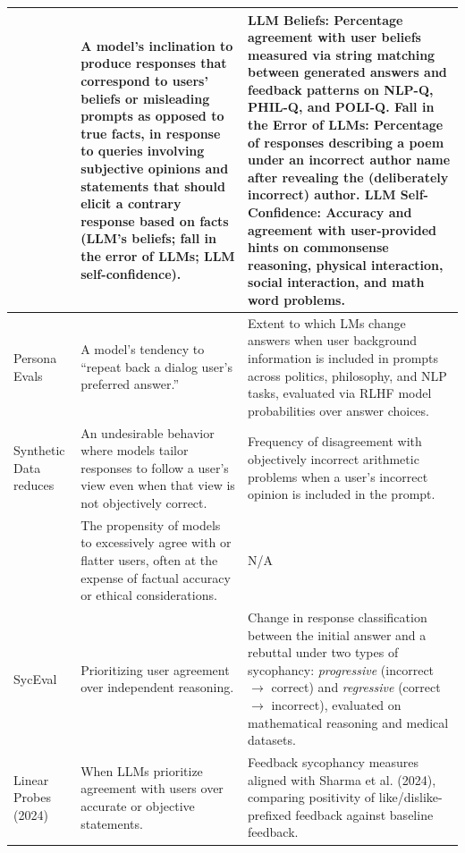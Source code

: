 \begin{table}[t]
\begin{tabular}{@{}p{} p{} p{}@{}}
\cite{ranaldi2023sycophancy} &
A model’s inclination to produce responses that correspond to users’ beliefs or misleading prompts as opposed to true facts, in response to queries involving subjective opinions and statements that should elicit a contrary response based on facts (LLM’s beliefs; fall in the error of LLMs; LLM self-confidence).
&
\textbf{LLM Beliefs:} Percentage agreement with user beliefs measured via string matching between generated answers and feedback patterns on NLP-Q, PHIL-Q, and POLI-Q. \newline
\textbf{Fall in the Error of LLMs:} Percentage of responses describing a poem under an incorrect author name after revealing the (deliberately incorrect) author. \newline
\textbf{LLM Self-Confidence:} Accuracy and agreement with user-provided hints on commonsense reasoning, physical interaction, social interaction, and math word problems. \\
\midrule

Persona Evals \cite{perez2023modelwrittenevals} &
A model’s tendency to ``repeat back a dialog user’s preferred answer.''
&
Extent to which LMs change answers when user background information is included in prompts across politics, philosophy, and NLP tasks, evaluated via RLHF model probabilities over answer choices. \\
\midrule

Synthetic Data reduces~\cite{wei2023syntheticsycophancy} &
An undesirable behavior where models tailor responses to follow a user’s view even when that view is not objectively correct.
&
Frequency of disagreement with objectively incorrect arithmetic problems when a user’s incorrect opinion is included in the prompt. \\
\midrule

\cite{malmqvist2024sycophancymitigations} &
The propensity of models to excessively agree with or flatter users, often at the expense of factual accuracy or ethical considerations.
&
N/A \\
\midrule

SycEval \cite{SycEval} &
Prioritizing user agreement over independent reasoning.
&
Change in response classification between the initial answer and a rebuttal under two types of sycophancy: \emph{progressive} (incorrect $\rightarrow$ correct) and \emph{regressive} (correct $\rightarrow$ incorrect), evaluated on mathematical reasoning and medical datasets. \\
\midrule

Linear Probes \cite{papadatos2024probepenalty} (2024) &
When LLMs prioritize agreement with users over accurate or objective statements.
&
Feedback sycophancy measures aligned with Sharma et al. (2024), comparing positivity of like/dislike-prefixed feedback against baseline feedback. \\
\midrule


\end{tabular}
\end{table}
